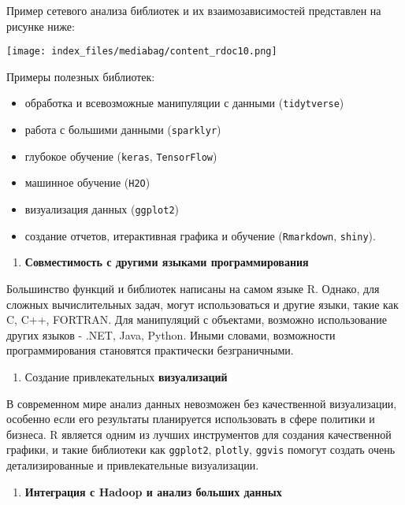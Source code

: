 \documentclass[
  letterpaper,
  DIV=11,
  numbers=noendperiod]{scrreprt}
\providecommand{\tightlist}{%
  \setlength{\itemsep}{0pt}\setlength{\parskip}{0pt}}\usepackage{longtable,booktabs,array}
\begin{document}
Пример сетевого анализа библиотек и их взаимозависимостей представлен на
рисунке ниже:

\texttt{[image: index\_files/mediabag/content\_rdoc10.png]}

Примеры полезных библиотек:

\begin{itemize}
\tightlist
\item
  обработка и всевозможные манипуляции с данными (\texttt{tidytverse})
\item
  работа с большими данными (\texttt{sparklyr})
\item
  глубокое обучение (\texttt{keras}, \texttt{TensorFlow})
\item
  машинное обучение (\texttt{H2O})
\item
  визуализация данных (\texttt{ggplot2})
\item
  создание отчетов, итерактивная графика и обучение (\texttt{Rmarkdown},
  \texttt{shiny}).
\end{itemize}

\begin{enumerate}
\def\labelenumi{\arabic{enumi}.}
\setcounter{enumi}{4}
\tightlist
\item
  \textbf{Совместимость с другими языками программирования}
\end{enumerate}

Большинство функций и библиотек написаны на самом языке R. Однако, для
сложных вычислительных задач, могут использоваться и другие языки, такие
как C, C++, FORTRAN. Для манипуляций с объектами, возможно использование
других языков - .NET, Java, Python. Иными словами, возможности
программирования становятся практически безграничными.

\begin{enumerate}
\def\labelenumi{\arabic{enumi}.}
\setcounter{enumi}{5}
\tightlist
\item
  Создание привлекательных \textbf{визуализаций}
\end{enumerate}

В современном мире анализ данных невозможен без качественной
визуализации, особенно если его результаты планируется использовать в
сфере политики и бизнеса. R является одним из лучших инструментов для
создания качественной графики, и такие библиотеки как \texttt{ggplot2},
\texttt{plotly}, \texttt{ggvis} помогут создать очень детализированные и
привлекательные визуализации.

\begin{enumerate}
\def\labelenumi{\arabic{enumi}.}
\setcounter{enumi}{6}
\tightlist
\item
  \textbf{Интеграция с Hadoop и анализ больших данных}
\end{enumerate}
\end{document}

